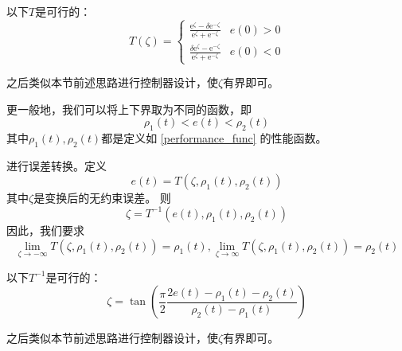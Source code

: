 \begin{example}
    以下$T$是可行的：
    \[T(\zeta) = \begin{cases}
        \frac{\mathrm{e}^\zeta-\delta \mathrm{e}^{-\zeta}}{\mathrm{e}^\zeta+ \mathrm{e}^{-\zeta}}&e(0)>0\\
        \frac{\delta\mathrm{e}^\zeta- \mathrm{e}^{-\zeta}}{\mathrm{e}^\zeta+ \mathrm{e}^{-\zeta}}&e(0)<0
    \end{cases}\]
\end{example}
之后类似本节前述思路进行控制器设计，使$\zeta$有界即可。

更一般地，我们可以将上下界取为不同的函数，即
\[\rho_1(t)<e(t)<\rho_2(t)\]
其中$\rho_1(t),\rho_2(t)$都是定义如 \ref{performance_func} 的性能函数。

进行误差转换。定义\[e(t)=T(\zeta,\rho_1(t),\rho_2(t))\]
其中$\zeta$是变换后的无约束误差。
则\[\zeta = T^{-1}(e(t),\rho_1(t),\rho_2(t))\]
因此，我们要求\[\lim\limits_{\zeta\to-\infty}T(\zeta,\rho_1(t),\rho_2(t))=\rho_1(t),\lim\limits_{\zeta\to\infty}T(\zeta,\rho_1(t),\rho_2(t))=\rho_2(t)\]
\begin{example}
    以下$T^{-1}$是可行的：
    \[\zeta = \tan\left(\frac{\pi}{2}\frac{2e(t)-\rho_1(t)-\rho_2(t)}{\rho_2(t)-\rho_1(t)}\right)\]
\end{example}

之后类似本节前述思路进行控制器设计，使$\zeta$有界即可。